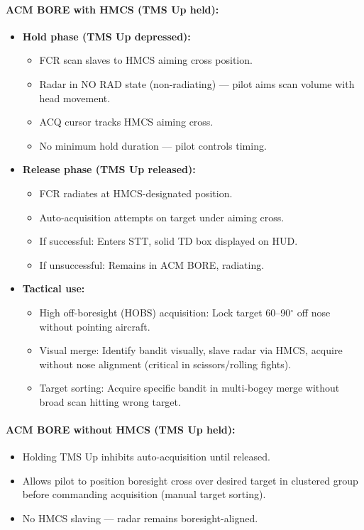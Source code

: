 \documentclass[11pt, a4paper, twoside]{report}
\begin{document}
\paragraph{ACM BORE with HMCS (TMS Up held):}
\begin{itemize}[nosep]
    \item \textbf{Hold phase (TMS Up depressed):}
    \begin{itemize}[nosep]
        \item FCR scan slaves to HMCS aiming cross position.
        \item Radar in NO RAD state (non-radiating) --- pilot aims scan volume with head movement.
        \item ACQ cursor tracks HMCS aiming cross.
        \item No minimum hold duration --- pilot controls timing.
    \end{itemize}
    
    \item \textbf{Release phase (TMS Up released):}
    \begin{itemize}[nosep]
        \item FCR radiates at HMCS-designated position.
        \item Auto-acquisition attempts on target under aiming cross.
        \item If successful: Enters STT, solid TD box displayed on HUD.
        \item If unsuccessful: Remains in ACM BORE, radiating.
    \end{itemize}
    
    \item \textbf{Tactical use:}
    \begin{itemize}[nosep]
        \item High off-boresight (HOBS) acquisition: Lock target 60--90$^\circ$ off nose without 
              pointing aircraft.
        \item Visual merge: Identify bandit visually, slave radar via HMCS, acquire without 
              nose alignment (critical in scissors/rolling fights).
        \item Target sorting: Acquire specific bandit in multi-bogey merge without broad 
              scan hitting wrong target.
    \end{itemize}
\end{itemize}

\paragraph{ACM BORE without HMCS (TMS Up held):}
\begin{itemize}[nosep]
    \item Holding TMS Up inhibits auto-acquisition until released.
    \item Allows pilot to position boresight cross over desired target in clustered 
          group before commanding acquisition (manual target sorting).
    \item No HMCS slaving --- radar remains boresight-aligned.
\end{itemize}
\end{document}
